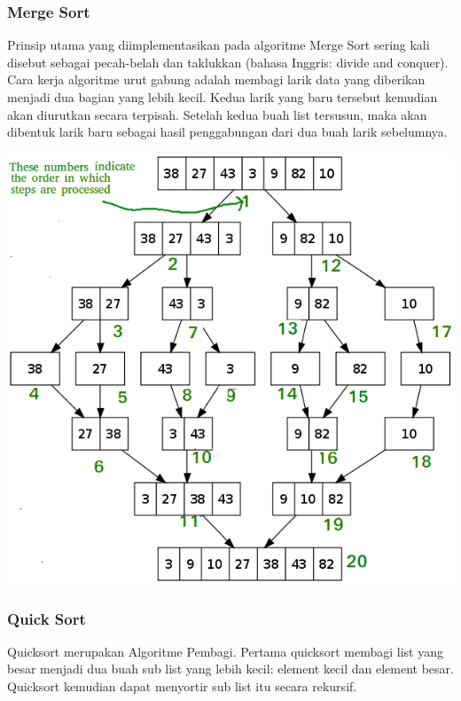 \documentclass[a4paper,12pt]{article}
\begin{document}
\subsubsection{Merge Sort}
Prinsip utama yang diimplementasikan pada algoritme Merge Sort sering kali disebut sebagai pecah-belah dan taklukkan
(bahasa Inggris: divide and conquer). Cara kerja algoritme urut gabung adalah membagi larik data yang diberikan menjadi
dua bagian yang lebih kecil. Kedua larik yang baru tersebut kemudian akan diurutkan secara terpisah. Setelah kedua buah
list tersusun, maka akan dibentuk larik baru sebagai hasil penggabungan dari dua buah larik sebelumnya.
\begin{center}
    \includegraphics[scale=0.6]{Merge-Sort-Tutorial.png} 
\end{center}

\subsubsection{Quick Sort}
Quicksort merupakan Algoritme Pembagi. Pertama quicksort membagi list yang besar menjadi dua buah sub list yang lebih
kecil: element kecil dan element besar. Quicksort kemudian dapat menyortir sub list itu secara rekursif.\\
\end{document}
